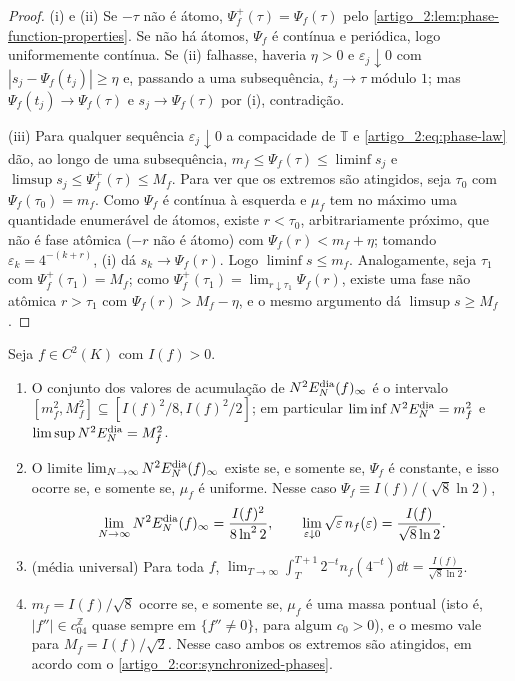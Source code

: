 \begin{proof}
(i) e (ii) Se $-\tau$ não é átomo, $\Psi_f^+(\tau)=\Psi_f(\tau)$ pelo
\cref{artigo_2:lem:phase-function-properties}. Se não há átomos, $\Psi_f$ é contínua e
periódica, logo uniformemente contínua. Se (ii) falhasse, haveria $\eta>0$ e
$\varepsilon_j\downarrow0$ com $|s_j-\Psi_f(t_j)|\ge\eta$ e, passando a uma
subsequência, $t_j\to\tau$ módulo $1$; mas $\Psi_f(t_j)\to\Psi_f(\tau)$ e $s_j\to\Psi_f(\tau)$
por (i), contradição.

(iii) Para qualquer sequência $\varepsilon_j\downarrow0$ a compacidade de
$\mathbb T$ e \eqref{artigo_2:eq:phase-law} dão, ao longo de uma subsequência,
$m_f\le\Psi_f(\tau)\le\liminf s_j$ e $\limsup s_j\le\Psi_f^+(\tau)\le M_f$.
Para ver que os extremos são atingidos, seja $\tau_0$ com $\Psi_f(\tau_0)=m_f$.
Como $\Psi_f$ é contínua à esquerda e $\mu_f$ tem no máximo uma quantidade
enumerável de átomos, existe $r<\tau_0$, arbitrariamente próximo, que não é
fase atômica ($-r$ não é átomo) com $\Psi_f(r)<m_f+\eta$; tomando
$\varepsilon_k=4^{-(k+r)}$, (i) dá $s_k\to\Psi_f(r)$. Logo
$\liminf s\le m_f$. Analogamente, seja $\tau_1$ com $\Psi_f^+(\tau_1)=M_f$; como
$\Psi_f^+(\tau_1)=\lim_{r\downarrow\tau_1}\Psi_f(r)$, existe uma fase não
atômica $r>\tau_1$ com $\Psi_f(r)>M_f-\eta$, e o mesmo argumento dá
$\limsup s\ge M_f$.
\end{proof}

\begin{corollary}\label{map:artigo_2:12.8}
\label{artigo_2:cor:phase-accumulation}
Seja $f\in C^2(K)$ com $I(f)>0$.
\begin{enumerate}[label=(\alph*)]
\item O conjunto dos valores de acumulação de $N^2E_N^{\rm dia}(f)_\infty$ é o
 intervalo $[m_f^2,M_f^2]\subseteq[I(f)^2/8,I(f)^2/2]$; em particular
 $\liminf N^2E_N^{\rm dia}=m_f^2$ e $\limsup N^2E_N^{\rm dia}=M_f^2$.
\item O limite $\lim_{N\to\infty}N^2E_N^{\rm dia}(f)_\infty$ existe se, e somente
 se, $\Psi_f$ é constante, e isso ocorre se, e somente se, $\mu_f$ é uniforme.
 Nesse caso $\Psi_f\equiv I(f)/(\sqrt8\ln2)$,
 \[
  \lim_{N\to\infty}N^2E_N^{\rm dia}(f)_\infty=\frac{I(f)^2}{8\ln^22},
  \qquad
  \lim_{\varepsilon\downarrow0}\sqrt\varepsilon\,n_f(\varepsilon)=\frac{I(f)}{\sqrt8\ln2}.
 \]
\item (média universal) Para toda $f$,
 $\displaystyle\lim_{T\to\infty}\int_T^{T+1}2^{-t}n_f(4^{-t})\dd t=\frac{I(f)}{\sqrt8\ln2}$.
\item $m_f=I(f)/\sqrt8$ ocorre se, e somente se, $\mu_f$ é uma massa pontual
 (isto é, $|f''|\in c_04^{\mathbb Z}$ quase sempre em $\{f''\ne0\}$, para
 algum $c_0>0$), e o mesmo vale para $M_f=I(f)/\sqrt2$. Nesse caso ambos os
 extremos são atingidos, em acordo com o \cref{artigo_2:cor:synchronized-phases}.
\end{enumerate}
\end{corollary}

